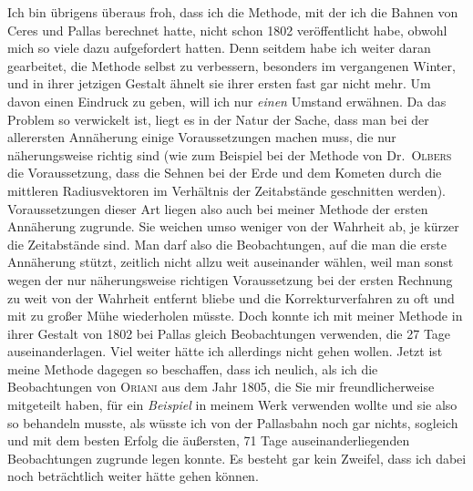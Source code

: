 \par\indent Ich bin übrigens überaus froh, dass ich die Methode, mit der ich die Bahnen von Ceres und Pallas berechnet hatte, nicht schon 1802 veröffentlicht habe, obwohl mich so viele dazu aufgefordert hatten. Denn seitdem habe ich weiter daran gearbeitet, die Methode selbst zu verbessern, besonders im vergangenen Winter, und in ihrer jetzigen Gestalt ähnelt sie ihrer ersten fast gar nicht mehr. Um davon einen Eindruck zu geben, will ich nur \emph{einen} Umstand erwähnen. Da das Problem so verwickelt ist, liegt es in der Natur der Sache, dass man bei der allerersten Annäherung einige Voraussetzungen machen muss, die nur näherungsweise richtig sind (wie zum Beispiel bei der Methode von Dr.~\textsc{Olbers} die Voraussetzung, dass die Sehnen bei der Erde und dem Kometen durch die mittleren Radiusvektoren im Verhältnis der Zeitabstände geschnitten werden). Voraussetzungen dieser Art liegen also auch bei meiner Methode der ersten Annäherung zugrunde. Sie weichen umso weniger von der Wahrheit ab, je kürzer die Zeitabstände sind. Man darf also die Beobachtungen, auf die man die erste Annäherung stützt, zeitlich nicht allzu weit auseinander wählen, weil man sonst wegen der nur näherungsweise richtigen Voraussetzung bei der ersten Rechnung zu weit von der Wahrheit entfernt bliebe und die Korrekturverfahren zu oft und mit zu großer Mühe wiederholen müsste. Doch konnte ich mit meiner Methode in ihrer Gestalt von 1802 bei Pallas gleich Beobachtungen verwenden, die 27 Tage auseinanderlagen. Viel weiter hätte ich allerdings nicht gehen wollen. Jetzt ist meine Methode dagegen so beschaffen, dass ich neulich, als ich die Beobachtungen von \textsc{Oriani} aus dem Jahr 1805, die Sie mir freundlicherweise mitgeteilt haben, für ein
%
\emph{Beispiel} in meinem Werk verwenden wollte und sie also so behandeln musste, als wüsste ich von der Pallasbahn noch gar nichts, sogleich und mit dem besten Erfolg die äußersten, 71 Tage auseinanderliegenden Beobachtungen zugrunde legen konnte. Es besteht gar kein Zweifel, dass ich dabei noch beträchtlich weiter hätte gehen können.

